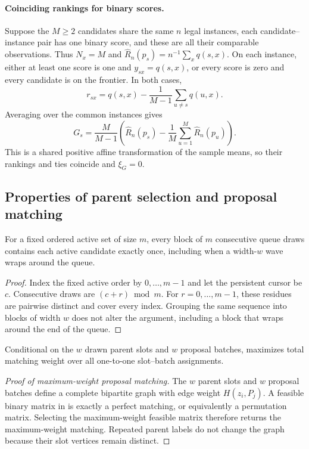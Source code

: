 \paragraph{Coinciding rankings for binary scores.}
Suppose the $M\ge2$ candidates share the same $n$ legal instances, each
candidate--instance pair has one binary score, and these are all their
comparable observations.  Thus $N_x=M$ and
$\widehat R_n(p_s)=n^{-1}\sum_x q(s,x)$.  On each instance, either at least
one score is one and $y_{sx}=q(s,x)$, or every score is zero and every
candidate is on the frontier.  In both cases,
\[
r_{sx}=q(s,x)-\frac{1}{M-1}\sum_{u\ne s}q(u,x).
\]
Averaging over the common instances gives
\begin{equation}
G_s=\frac{M}{M-1}\left(
\widehat R_n(p_s)-\frac1M\sum_{u=1}^M\widehat R_n(p_u)
\right).
\label{eq:binary_credit_mean}
\end{equation}
This is a shared positive affine transformation of the sample means, so
their rankings and ties coincide and $\xi_G=0$.

\subsection{Properties of parent selection and proposal matching}

\begin{proposition}
For a fixed ordered active set of size $m$, every block of $m$ consecutive
queue draws contains each active candidate exactly once, including when a
width-$w$ wave wraps around the queue.
\end{proposition}

\begin{proof}
Index the fixed active order by $0,\ldots,m-1$ and let the persistent cursor
be $c$.  Consecutive draws are $(c+r)\bmod m$.  For
$r=0,\ldots,m-1$, these residues are pairwise distinct and cover every index.
Grouping the same sequence into blocks of width $w$ does not alter the argument,
including a block that wraps around the end of the queue.
\end{proof}

\begin{proposition}
Conditional on the $w$ drawn parent slots and $w$ proposal batches,
 maximizes total matching weight over all
one-to-one slot--batch assignments.
\end{proposition}

\begin{proof}[Proof of maximum-weight proposal matching]
The $w$ parent slots and $w$ proposal batches define a complete bipartite graph
with edge weight $H(z_i,P_j)$.  A feasible binary matrix in
 is exactly a perfect matching, or equivalently a
permutation matrix.  Selecting the maximum-weight feasible matrix therefore
returns the maximum-weight matching.  Repeated parent labels do not change the graph because
their slot vertices remain distinct.
\end{proof}

